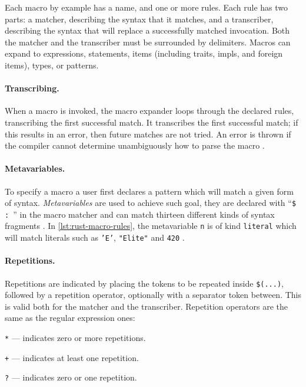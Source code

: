 \begin{displayquote}
    Each macro by example has a name, and one or more rules.
    Each rule has two parts: a matcher, describing the syntax that it matches, and a transcriber,
    describing the syntax that will replace a successfully matched invocation.
    Both the matcher and the transcriber must be surrounded by delimiters.
    Macros can expand to expressions, statements, items
    (including traits, impls, and foreign items), types, or patterns.
\end{displayquote}

\paragraph{Transcribing.}
When a macro is invoked, the macro expander loops through the declared rules, transcribing the first successful match.
It transcribes the first successful match; if this results in an error, then future matches are not tried.
An error is thrown if the compiler cannot determine unambiguously how to parse the macro
\autocite[Section 3.1 - Transcribing]{RustRef2021}.

\paragraph{Metavariables.}
To specify a macro a user first declares a pattern which will match a given form of syntax.
\emph{Metavariables} are used to achieve such goal,
they are declared with “\texttt{\$  : }” in the macro matcher and
can match thirteen different kinds of syntax fragments \autocite[Section 3.1 - Metavariables]{RustRef2021}.
In \autoref{lst:rust-macro-rules}, the metavariable \texttt{n} is of kind \texttt{literal}
which will match literals such as \texttt{'E'}, \texttt{"Elite"} and \texttt{420} \autocite[Section 8.2.1]{RustRef2021}.

\paragraph{Repetitions.}
Repetitions are indicated by placing the tokens to be repeated inside \texttt{\$(...)},
followed by a repetition operator, optionally with a separator token between.
This is valid both for the matcher and the transcriber.
Repetition operators are the same as the regular expression ones:
\begin{compactitem}
    \item \texttt{*} — indicates zero or more repetitions.
    \item \texttt{+} — indicates at least one repetition.
    \item \texttt{?} — indicates zero or one repetition.
\end{compactitem}


